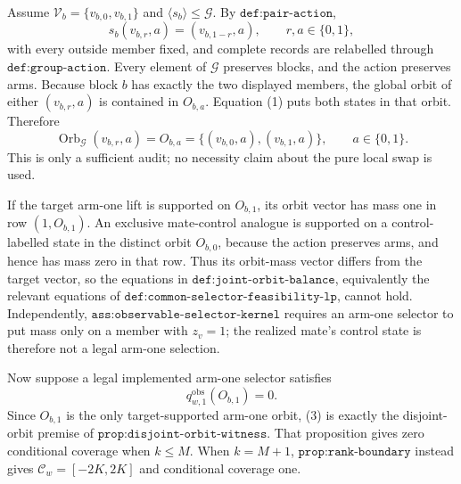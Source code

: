 Assume \(\mathcal V_b=\{v_{b,0},v_{b,1}\}\) and \(\langle s_b\rangle\le\mathcal G\). By \(\texttt{def:pair-action}\),
\[
s_b(v_{b,r},a)=(v_{b,1-r},a),\qquad r,a\in\{0,1\},
\tag{1}
\]
with every outside member fixed, and complete records are relabelled through \(\texttt{def:group-action}\). Every element of \(\mathcal G\) preserves blocks, and the action preserves arms. Because block \(b\) has exactly the two displayed members, the global orbit of either \((v_{b,r},a)\) is contained in \(O_{b,a}\). Equation (1) puts both states in that orbit. Therefore
\[
\operatorname{Orb}_{\mathcal G}(v_{b,r},a)=O_{b,a}=\{(v_{b,0},a),(v_{b,1},a)\},\qquad a\in\{0,1\}.
\tag{2}
\]
This is only a sufficient audit; no necessity claim about the pure local swap is used.

If the target arm-one lift is supported on \(O_{b,1}\), its orbit vector has mass one in row \((1,O_{b,1})\). An exclusive mate-control analogue is supported on a control-labelled state in the distinct orbit \(O_{b,0}\), because the action preserves arms, and hence has mass zero in that row. Thus its orbit-mass vector differs from the target vector, so the equations in \(\texttt{def:joint-orbit-balance}\), equivalently the relevant equations of \(\texttt{def:common-selector-feasibility-lp}\), cannot hold. Independently, \(\texttt{ass:observable-selector-kernel}\) requires an arm-one selector to put mass only on a member with \(z_v=1\); the realized mate's control state is therefore not a legal arm-one selection.

Now suppose a legal implemented arm-one selector satisfies
\[
q^{\mathrm{obs}}_{w,1}(O_{b,1})=0.
\tag{3}
\]
Since \(O_{b,1}\) is the only target-supported arm-one orbit, (3) is exactly the disjoint-orbit premise of \(\texttt{prop:disjoint-orbit-witness}\). That proposition gives zero conditional coverage when \(k\le M\). When \(k=M+1\), \(\texttt{prop:rank-boundary}\) instead gives \(\mathcal C_w=[-2K,2K]\) and conditional coverage one.